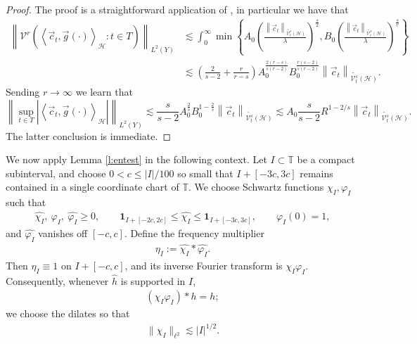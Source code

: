 \documentclass[12pt]{amsart}
\numberwithin{equation}{section}
\theoremstyle{definition}
\begin{document}
\begin{proof}
    The proof is a straightforward application of \cite[Lemma 2.6]{ZK15}, in particular we have that \[ \begin{split}
\left\| \mathcal{V}^r\left( \left \langle \vec{c}_t,\vec{g}(\cdot) \right \rangle_{\mathcal{H}}:t \in T\right)  \right\|_{L^2(Y)} &\lesssim \int_{0}^{\infty} \min \left\{ A_0 \left(\frac{\left\| \vec{c}_t \right\|_{\widetilde{\mathcal{V}_t^s}(\mathcal{H})}}{\lambda}\right)^{\frac{s}{2}},B_0 \left(\frac{\left\| \vec{c}_t \right\|_{\widetilde{\mathcal{V}_t^s}(\mathcal{H})}}{\lambda}\right)^{\frac{s}{r}}  \right\} \\ & \lesssim \left ( \frac{2}{s-2}+\frac{r}{r-s} \right) A_0^{\frac{2(r-s)}{s(r-2)}}B_0^{\frac{r(s-2)}{s(r-2)}} \left\| \vec{c}_t \right\|_{\widetilde{\mathcal{V}_t^s}(\mathcal{H})}.\end{split}  \]
Sending $r \to \infty$ we learn that \[ \left\| \sup_{t \in T} \left| \left \langle \vec{c}_t,\vec{g}(\cdot)\right \rangle_{\mathcal{H}} \right| \right \|_{L^2(Y)} \lesssim \frac{s}{s-2} A_0^{\frac{2}{s}}B_0^{1-\frac{2}{s}} \left\| \vec{c}_t \right\|_{\widetilde{\mathcal{V}_t^s}(\mathcal{H})} \lesssim A_0\frac{s}{s-2} R^{1-2/s} \left\| \vec{c}_t \right\|_{\widetilde{\mathcal{V}_t^s}(\mathcal{H})}.  \] The latter conclusion is immediate.
\end{proof}


We now apply Lemma \ref{l:entest} in the following context.
Let $I\subset \mathbb T$ be a compact subinterval, and choose $0<c\leq |I|/100$ so small that $I+[-3c,3c]$ remains contained in a single coordinate chart of $\mathbb T$.  We choose Schwartz functions $\chi_I,\varphi_I$ such that
\begin{align}
    \widehat{\chi_I},\ \varphi_I,\ \widehat{\varphi_I}\geq 0,\qquad
    \mathbf 1_{I+[-2c,2c]}\leq \widehat{\chi_I}\leq \mathbf 1_{I+[-3c,3c]},
    \qquad \varphi_I(0)=1,
\end{align}
and $\widehat{\varphi_I}$ vanishes off $[-c,c]$.  Define the frequency multiplier
\begin{align}
    \eta_I:=\widehat{\chi_I}*\widehat{\varphi_I}.
\end{align}
Then $\eta_I\equiv1$ on $I+[-c,c]$, and its inverse Fourier transform is $\chi_I\varphi_I$.  Consequently, whenever $\widehat h$ is supported in $I$,
\begin{align}
    (\chi_I\varphi_I)*h=h;
\end{align}
we choose the dilates so that
\begin{align}
    \|\chi_I\|_{\ell^2}\lesssim |I|^{1/2}.
\end{align}
\end{document}
